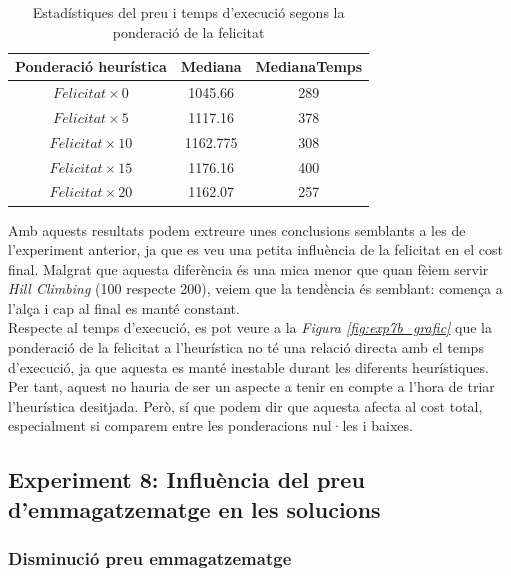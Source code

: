 \documentclass[a4paper]{article}
\begin{document}
	\begin{table}[H]
		\centering
		\begin{tabular}{|c|c|c|}
			\hline
			\textbf{Ponderació heurística} & \textbf{Mediana} & \textbf{MedianaTemps} \\
			\hline
			$Felicitat \times 0$ & 1045.66 & 289\\
			\hline
			$Felicitat \times 5$ & 1117.16 & 378\\
			\hline
			$Felicitat \times 10$ & 1162.775 & 308\\
			\hline
			$Felicitat \times 15$ & 1176.16 & 400\\
			\hline
			$Felicitat \times 20$ & 1162.07 & 257\\
			\hline
		\end{tabular}
		\caption{Estadístiques del preu i temps d'execució segons la ponderació de la felicitat}
		\label{tab:exp7_estadisticas}
	\end{table}
	
	Amb aquests resultats podem extreure unes conclusions semblants a les de l'experiment anterior, ja que es veu una petita influència de la felicitat en el cost final. Malgrat que aquesta diferència és una mica menor que quan fèiem servir \textit{Hill Climbing} (100 respecte 200), veiem que la tendència és semblant: comença a l'alça i cap al final es manté constant. \\
	
	Respecte al temps d'execució, es pot veure a la \textit{Figura \ref{fig:exp7b_grafic}} que la ponderació de la felicitat a l'heurística no té una relació directa amb el temps d'execució, ja que aquesta es manté inestable durant les diferents heurístiques. Per tant, aquest no hauria de ser un aspecte a tenir en compte a l'hora de triar l'heurística desitjada. Però, sí que podem dir que aquesta afecta al cost total, especialment si comparem entre les ponderacions nul·les i baixes. \\
	
	
	\subsection{Experiment 8: Influència del preu d'emmagatzematge en les solucions}
	
	\subsubsection{Disminució preu emmagatzematge}
	
\end{document}
